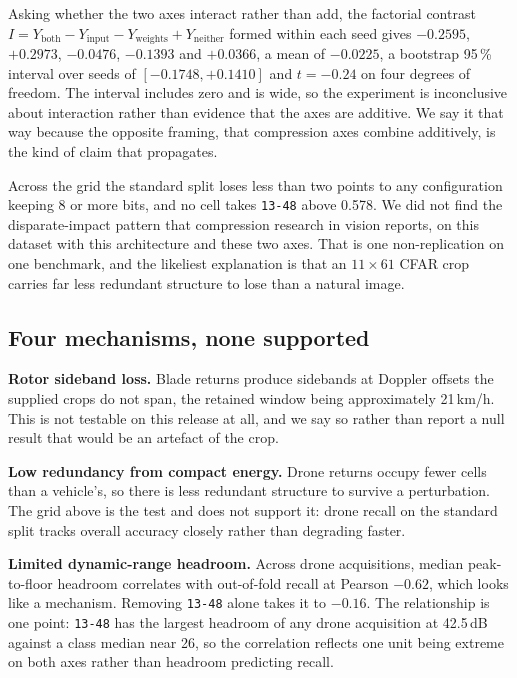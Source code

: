 \documentclass[11pt,a4paper]{article}
\newcommand{\s}[1]{\texttt{#1}}            %
\newcommand{\tgt}{\s{13-48}}               %
\begin{document}
Asking whether the two axes interact rather than add, the factorial
contrast $I = Y_{\mathrm{both}} - Y_{\mathrm{input}} - Y_{\mathrm{weights}}
+ Y_{\mathrm{neither}}$ formed within each seed gives $-0.2595$, $+0.2973$,
$-0.0476$, $-0.1393$ and $+0.0366$, a mean of $-0.0225$, a bootstrap
95\,\% interval over seeds of $[-0.1748, +0.1410]$ and $t = -0.24$ on four
degrees of freedom. The interval includes zero and is wide, so the
experiment is inconclusive about interaction rather than evidence that the
axes are additive. We say it that way because the opposite framing, that
compression axes combine additively, is the kind of claim that propagates.

Across the grid the standard split loses less than two points to any
configuration keeping 8 or more bits, and no cell takes \tgt{} above 0.578.
We did not find the disparate-impact pattern that compression research in
vision reports, on this dataset with this architecture and these two axes.
That is one non-replication on one benchmark, and the likeliest explanation
is that an $11 \times 61$ CFAR crop carries far less redundant structure to
lose than a natural image.

\subsection{Four mechanisms, none supported}
\label{sec:mech}

\textbf{Rotor sideband loss.} Blade returns produce sidebands at Doppler
offsets the supplied crops do not span, the retained window being
approximately 21\,km/h. This is not testable on this release at all, and we
say so rather than report a null result that would be an artefact of the
crop.

\textbf{Low redundancy from compact energy.} Drone returns occupy fewer
cells than a vehicle's, so there is less redundant structure to survive a
perturbation. The grid above is the test and does not support it: drone
recall on the standard split tracks overall accuracy closely rather than
degrading faster.

\textbf{Limited dynamic-range headroom.} Across drone acquisitions, median
peak-to-floor headroom correlates with out-of-fold recall at Pearson
$-0.62$, which looks like a mechanism. Removing \tgt{} alone takes it to
$-0.16$. The relationship is one point: \tgt{} has the largest headroom of
any drone acquisition at 42.5\,dB against a class median near 26, so the
correlation reflects one unit being extreme on both axes rather than
headroom predicting recall.
\end{document}
